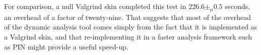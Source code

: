 For comparison, a null Valgrind skin completed this test in $226.6
\pm_\mu 0.5$ seconds, an overhead of a factor of twenty-nine.  That
suggests that most of the overhead of the dynamic analysis tool comes
simply from the fact that it is implemented as a Valgrind skin, and
that re-implementing it in a faster analysis framework such as
PIN\cite{Luk2005} might provide a useful speed-up.

